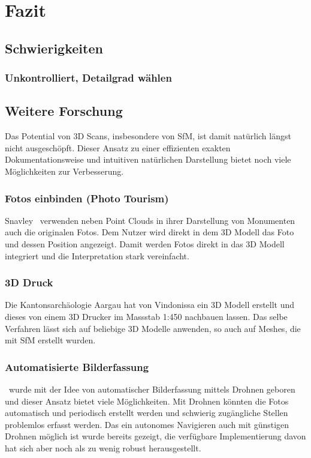 \chapter{Fazit}

	\section{Schwierigkeiten}
		\subsection{Unkontrolliert, Detailgrad wählen}
		
	\section{Weitere Forschung}
		Das Potential von 3D Scans, insbesondere von SfM, ist damit natürlich längst nicht ausgeschöpft. Dieser Ansatz zu einer effizienten exakten Dokumentationsweise und intuitiven natürlichen Darstellung bietet noch viele Möglichkeiten zur Verbesserung.
		
		\subsection{Fotos einbinden (Photo Tourism)}
			Snavley \etal\ verwenden neben Point Clouds in ihrer Darstellung von Monumenten auch die originalen Fotos. Dem Nutzer wird direkt in dem 3D Modell das Foto und dessen Position angezeigt. Damit werden Fotos direkt in das 3D Modell integriert und die Interpretation stark vereinfacht.
			
		\subsection{3D Druck}
			Die Kantonsarchäologie Aargau hat von Vindonissa ein 3D Modell erstellt und dieses von einem 3D Drucker im Massstab 1:450 nachbauen lassen. Das selbe Verfahren lässt sich auf beliebige 3D Modelle anwenden, so auch auf Meshes, die mit SfM erstellt wurden.
			
		\subsection{Automatisierte Bilderfassung}
			\dronarch\ wurde mit der Idee von automatischer Bilderfassung mittels Drohnen geboren und dieser Ansatz bietet viele Möglichkeiten. Mit Drohnen könnten die Fotos automatisch und periodisch erstellt werden und schwierig zugängliche Stellen problemlos erfasst werden. Das ein autonomes Navigieren auch mit günstigen Drohnen möglich ist wurde bereits gezeigt, die verfügbare Implementierung davon hat sich aber noch als zu wenig robust herausgestellt.
			
